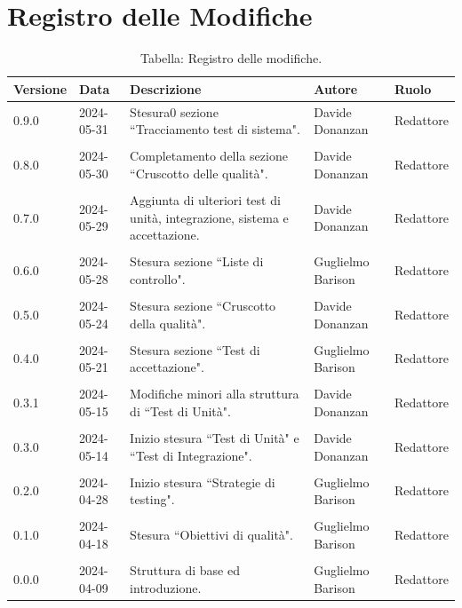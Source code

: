 \documentclass[8pt]{article}
\begin{document}
\section*{Registro delle Modifiche}
\begin{table}[ht!]	
	\centering
	\begin{tabular}{p{1.2cm} p{2cm} p{6cm} p{3cm} p{2cm}}
		\toprule
		\textbf{Versione}& \textbf{Data} & \textbf{Descrizione} & \textbf{Autore} & \textbf{Ruolo} \\
		\midrule
        0.9.0 & 2024-05-31 & Stesura0 sezione ``Tracciamento test di sistema". & Davide Donanzan & Redattore \\\\
        0.8.0 & 2024-05-30 & Completamento della sezione ``Cruscotto delle qualità". & Davide Donanzan & Redattore \\\\
        0.7.0 & 2024-05-29 & Aggiunta di ulteriori test di unità, integrazione, sistema e accettazione. & Davide Donanzan & Redattore \\\\
        0.6.0 & 2024-05-28 & Stesura sezione ``Liste di controllo". & Guglielmo Barison & Redattore \\\\
        0.5.0 & 2024-05-24 & Stesura sezione ``Cruscotto della qualità". & Davide Donanzan & Redattore \\\\
        0.4.0 & 2024-05-21 & Stesura sezione ``Test di accettazione". & Guglielmo Barison & Redattore \\\\
        0.3.1 & 2024-05-15 & Modifiche minori alla struttura di ``Test di Unità". & Davide Donanzan & Redattore \\\\
		0.3.0 & 2024-05-14 & Inizio stesura ``Test di Unità" e ``Test di Integrazione". & Davide Donanzan & Redattore \\\\
		0.2.0 & 2024-04-28 & Inizio stesura ``Strategie di testing". & Guglielmo Barison & Redattore \\\\
		0.1.0 & 2024-04-18 & Stesura ``Obiettivi di qualità". & Guglielmo Barison & Redattore \\\\
		0.0.0 & 2024-04-09 & Struttura di base ed introduzione.  & Guglielmo Barison & Redattore \\
		\bottomrule
	\end{tabular}
	\caption*{Tabella: Registro delle modifiche.}
	\label{table:Registro delle modifiche}
\end{table}
\newpage
\tableofcontents
\newpage
\listoffigures
\newpage
\listoftables
\newpage
\justifying
\end{document}
